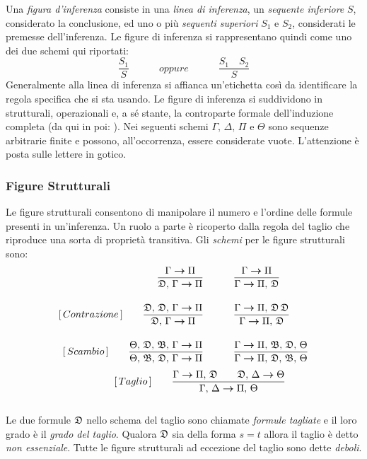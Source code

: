 		Una \emph{figura d'inferenza} consiste in una \emph{linea di inferenza}, un \emph{sequente inferiore} $S$, considerato la conclusione, ed uno o più \emph{sequenti superiori} $S_{1}$ e $S_{2}$, considerati le premesse dell'inferenza. Le figure di inferenza si rappresentano quindi come uno dei due schemi qui riportati:
	\begin{equation}
			\frac{S_{1}}{S} \qquad \quad oppure\quad \qquad \frac{S_{1} \quad S_{2}}{S} \nonumber
	\end{equation}
		Generalmente alla linea di inferenza si affianca un'etichetta così da identificare la regola specifica che si sta usando.
		Le figure di inferenza si suddividono in strutturali, operazionali e, a sé stante, la controparte formale dell'induzione completa (da qui in poi: ). Nei seguenti schemi $\Gamma,\, \Delta,\, \Pi$ e $\Theta$ sono sequenze arbitrarie finite e possono, all'occorrenza, essere considerate vuote. L'attenzione è posta sulle lettere in gotico.
	\subsubsection{Figure Strutturali}
		Le figure strutturali consentono di manipolare il numero e l'ordine delle formule presenti in un'inferenza. Un ruolo a parte è ricoperto dalla regola del taglio che riproduce una sorta di proprietà transitiva. Gli \emph{schemi} per le figure strutturali sono:
		\smallskip
	\begin{align}
		[\,Indebolimento\,]\qquad \frac{\Gamma \seq \Pi}{\gothD,\,\Gamma \seq \Pi} \quad & \qquad \frac{\Gamma \seq \Pi}{\Gamma \seq \Pi,\,\gothD} \nonumber \\[4mm]
		[\,Contrazione\,]\qquad \frac{\gothD,\,\gothD,\,\Gamma \seq \Pi}{\gothD,\,\Gamma \seq \Pi} \quad & \qquad \frac{\Gamma \seq \Pi,\,\gothD\,\gothD}{\Gamma \seq \Pi,\,\gothD} \nonumber \\[4mm]
		[\,Scambio\,]\qquad \frac{\Theta,\,\gothD,\,\gothB,\,\Gamma \seq \Pi}{\Theta,\,\gothB,\,\gothD,\,\Gamma \seq \Pi} \quad & \qquad \frac{\Gamma \seq \Pi,\,\gothB,\,\gothD,\,\Theta}{\Gamma \seq \Pi,\,\gothD,\,\gothB,\,\Theta} \nonumber
	\end{align} 
		\smallskip
	\begin{equation}
		 \qquad \quad \; [\,Taglio\,]\qquad  \frac{\Gamma \bm{\rightarrow} \Pi,\,\mathfrak{D} \quad \quad \mathfrak{D},\,\Delta \bm{\rightarrow} \Theta}{\Gamma,\,\Delta \bm{\rightarrow} \Pi,\,\Theta} \nonumber
	\end{equation}
		\\[3mm]
		Le due formule $\mathfrak{D}$ nello schema del taglio sono chiamate \emph{formule tagliate} e il loro grado è il \emph{grado del taglio}. Qualora $\mathfrak{D}$ sia della forma $s=t$ allora il taglio è detto \emph{non essenziale}. Tutte le figure strutturali ad eccezione del taglio sono dette \emph{deboli}.
		
